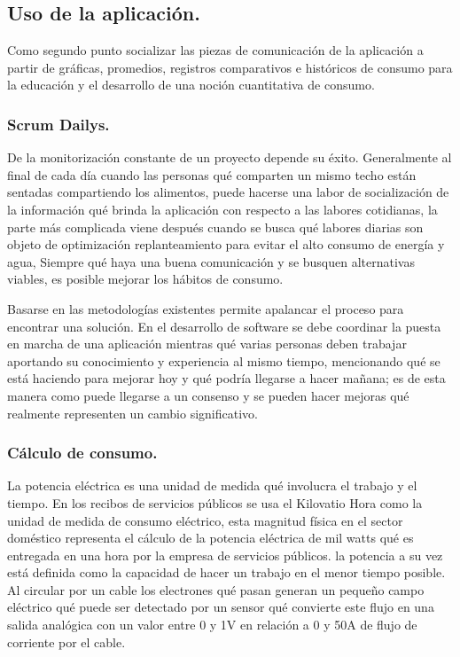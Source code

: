 \documentclass[a4paper,man,natbib]{apa6}
\begin{document}
\subsection{Uso de la aplicación.}
Como segundo punto socializar las piezas de comunicación de la aplicación a partir de gráficas, promedios, registros comparativos e históricos de consumo para la educación y el desarrollo de una noción cuantitativa de consumo.\newline

\subsubsection{Scrum Dailys.}
De la monitorización constante de un proyecto depende su éxito. Generalmente al final de cada día cuando las personas qué comparten un mismo techo están sentadas compartiendo los alimentos, puede hacerse una labor de socialización de la información qué brinda la aplicación con respecto a las labores cotidianas, la parte más complicada viene después cuando se busca qué labores diarias son objeto de optimización replanteamiento para evitar el alto consumo de energía y agua, Siempre qué haya una buena comunicación y se busquen alternativas viables, es posible mejorar los hábitos de consumo.
\newline

Basarse en las metodologías existentes permite apalancar el proceso para encontrar una solución. En el desarrollo de software se debe coordinar la puesta en marcha de una aplicación mientras qué varias personas deben trabajar aportando su conocimiento y experiencia al mismo tiempo, mencionando qué se está haciendo para mejorar hoy y qué podría llegarse a hacer mañana; es de esta manera como puede llegarse a un consenso y se pueden hacer mejoras qué realmente representen un cambio significativo.\newline

\subsubsection{Cálculo de consumo.}
La potencia eléctrica es una unidad de medida qué involucra el trabajo y el tiempo. En los recibos de servicios públicos se usa el Kilovatio Hora como la unidad de medida de consumo eléctrico, esta magnitud física en el sector doméstico representa el cálculo de la potencia eléctrica de mil watts qué es entregada en una hora por la empresa de servicios públicos. la potencia a su vez está definida como la capacidad de hacer un trabajo en el menor tiempo posible. Al circular por un cable los electrones qué pasan generan un pequeño campo eléctrico qué puede ser detectado por un sensor qué convierte este flujo en una salida analógica con un valor entre 0 y 1V en relación a 0 y 50A de flujo de corriente por el cable.
\newline
\end{document}
